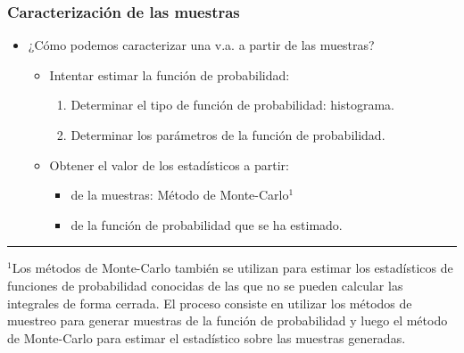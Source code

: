 \documentclass{beamer}
\numberwithin{section}{part}
\begin{document}
\begin{frame}
  \frametitle{Caracterización de las muestras}  
  \footnotesize  

  \begin{itemize}
    \item ¿Cómo podemos caracterizar una v.a. a partir de las muestras?
    \begin{itemize}
      \footnotesize
      \item Intentar estimar la función de probabilidad:
      \begin{enumerate}
        \footnotesize
        \item Determinar el tipo de función de probabilidad: histograma.
        \item Determinar los parámetros de la función de probabilidad.
      \end{enumerate}      
      \item Obtener el valor de los estadísticos a partir:
      \begin{itemize}
        \item de la muestras: Método de Monte-Carlo$^1$
        \item de la función de probabilidad que se ha estimado.
      \end{itemize}
    \end{itemize}
  \end{itemize}
  
  \vspace{0.5cm}
  
  \rule{11cm}{0.04ex}
  \scriptsize
  
  $^1$Los métodos de Monte-Carlo también se utilizan para estimar los estadísticos de funciones de probabilidad conocidas de las que no se pueden calcular las integrales de forma cerrada. El proceso consiste en utilizar los métodos de muestreo para generar muestras de la función de probabilidad y luego el método de Monte-Carlo para estimar el estadístico sobre las muestras generadas.
\end{frame}
\end{document}
